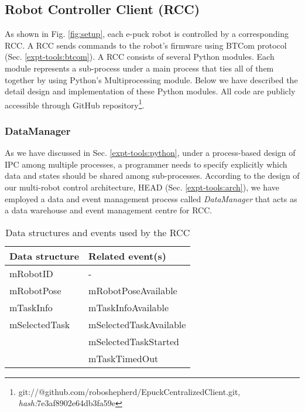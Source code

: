 \subsection{Robot Controller Client (RCC)}
As shown in Fig. \ref{fig:setup}, each e-puck robot is controlled by a corresponding RCC. A RCC sends commands to the robot's firmware using BTCom protocol  (Sec. \ref{expt-tools:btcom}).
A RCC consists of several Python modules. Each module represents a sub-process under a main process that ties all of them together by using Python's Multiprocessing module. Below we have described the detail design and implementation of these Python modules. All code are publicly accessible through GitHub repository\footnote{git://@github.com/roboshepherd/EpuckCentralizedClient.git,    
\textit{hash:}7e3af8902e64db3fa59e}.
\subsubsection*{DataManager}
As we have discussed in Sec. \ref{expt-tools:python}, under a process-based design of IPC among multiple processes, a programmer needs to specify explicitly which data and states should be shared among sub-processes. According to the design of our multi-robot control architecture, HEAD (Sec. \ref{expt-tools:arch}), we have employed a data and event management process called {\em DataManager} that acts as a data warehouse and event management centre for RCC.\\
\begin{table}
\caption{Data structures and events used by the RCC}
\begin{center}
\begin{tabular}{|l|l|}
\hline \textbf{Data structure} & \textbf{Related event(s)}\\ 
\hline mRobotID & - \\ 
\hline mRobotPose & mRobotPoseAvailable\\ 
\hline mTaskInfo & mTaskInfoAvailable\\ 
\hline mSelectedTask & mSelectedTaskAvailable\\
 &  mSelectedTaskStarted\\
 &  mTaskTimedOut\\
 \hline 
\end{tabular}
\end{center}
\label{table:data-mgr}
\end{table} 

